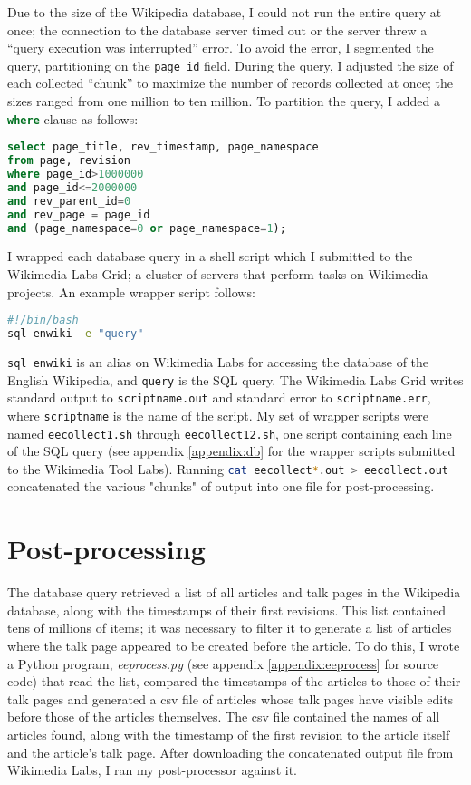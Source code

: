 \documentclass[14pt,a4paper]{report}
\begin{document}
Due to the size of the Wikipedia database, I could not run the entire query at once; the connection to the database server timed out or the server threw a ``query execution was interrupted'' error. To avoid the error, I segmented the query, partitioning on the \lstinline[language=sql]{page_id} field. During the query, I adjusted the size of each collected ``chunk'' to maximize the number of records collected at once; the sizes ranged from one million to ten million. To partition the query, I added a \lstinline[language=sql]{where} clause as follows:
\begin{lstlisting}[language=sql]
select page_title, rev_timestamp, page_namespace
from page, revision
where page_id>1000000
and page_id<=2000000
and rev_parent_id=0
and rev_page = page_id
and (page_namespace=0 or page_namespace=1);
\end{lstlisting}
I wrapped each database query in a shell script which I submitted to the Wikimedia Labs Grid; a cluster of servers that perform tasks on Wikimedia projects. \autocite{grid} An example wrapper script follows:
\begin{lstlisting}[language=sh]
#!/bin/bash
sql enwiki -e "query"
\end{lstlisting}
\lstinline[language=sh]{sql enwiki} is an alias on Wikimedia Labs for accessing the database of the English Wikipedia, and \lstinline[language=sh]{query} is the SQL query. The Wikimedia Labs Grid writes standard output to \lstinline[language=sh]{scriptname.out} and standard error to \lstinline[language=sh]{scriptname.err}, where \lstinline[language=sh]{scriptname} is the name of the script. My set of wrapper scripts were named \lstinline[language=sh]{eecollect1.sh} through \lstinline[language=sh]{eecollect12.sh}, one script containing each line of the SQL query (see appendix \ref{appendix:db} for the wrapper scripts submitted to the Wikimedia Tool Labs). Running \lstinline[language=sh]{cat eecollect*.out > eecollect.out} concatenated the various "chunks" of output into one file for post-processing.

\chapter{Post-processing}
The database query retrieved a list of all articles and talk pages in the Wikipedia database, along with the timestamps of their first revisions. This list contained tens of millions of items; it was necessary to filter it to generate a list of articles where the talk page appeared to be created before the article. To do this, I wrote a Python program, \textit{eeprocess.py} (see appendix \ref{appendix:eeprocess} for source code) that read the list, compared the timestamps of the articles to those of their talk pages and generated a csv file of articles whose talk pages have visible edits before those of the articles themselves. The csv file contained the names of all articles found, along with the timestamp of the first revision to the article itself and the article's talk page. After downloading the concatenated output file from Wikimedia Labs, I ran my post-processor against it.
\end{document}
